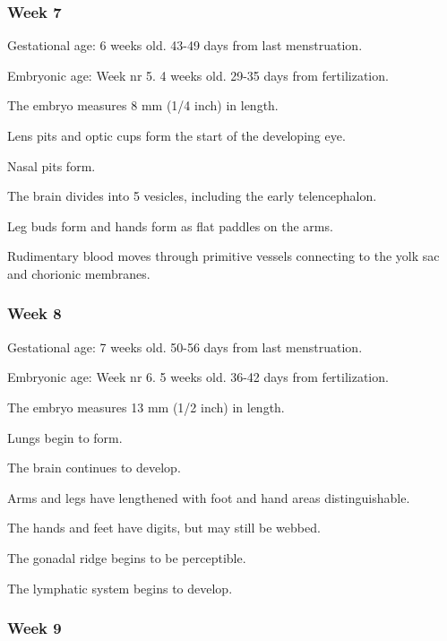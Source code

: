 \documentclass[12pt,a4paper,onecolumn]{article}
\begin{document}
\subsubsection{Week 7}

Gestational age: 6 weeks old. 43-49 days from last menstruation.

Embryonic age: Week nr 5. 4 weeks old. 29-35 days from fertilization.

\begin{wuxch_item}
    \item The embryo measures 8 mm (1/4 inch) in length.
    \item Lens pits and optic cups form the start of the developing eye.
    \item Nasal pits form.
    \item The brain divides into 5 vesicles, including the early telencephalon.
    \item Leg buds form and hands form as flat paddles on the arms.
    \item Rudimentary blood moves through primitive vessels connecting to the yolk sac and chorionic membranes.
\end{wuxch_item}

\subsubsection{Week 8}

Gestational age: 7 weeks old. 50-56 days from last menstruation.

Embryonic age: Week nr 6. 5 weeks old. 36-42 days from fertilization.

\begin{wuxch_item}
    \item The embryo measures 13 mm (1/2 inch) in length.
    \item Lungs begin to form.
    \item The brain continues to develop.
    \item Arms and legs have lengthened with foot and hand areas distinguishable.
    \item The hands and feet have digits, but may still be webbed.
    \item The gonadal ridge begins to be perceptible.
    \item The lymphatic system begins to develop.
\end{wuxch_item}

\subsubsection{Week 9}
\end{document}
